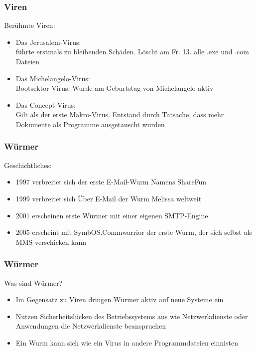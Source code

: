 \documentclass{beamer}
\begin{document}
\begin{frame}
	\frametitle{Viren}
	\begin{block}{Berühmte Viren:}
		\begin{itemize}
			\item Das Jerusalem-Virus:\\
			führte erstmals zu bleibenden Schäden. Löscht am Fr. 13. alle .exe und .com Dateien
			\item Das Michelangelo-Virus:\\
			Bootsektor Virus. Wurde am Geburtstag von Michelangelo aktiv
			\item Das Concept-Virus:\\
			Gilt als der erste Makro-Virus. Entstand durch Tatsache, dass mehr Dokumente als Programme ausgetauscht wurden
		\end{itemize}
	\end{block}			
\end{frame}

\begin{frame}
	\frametitle{Würmer}
		\begin{block}{Geschichtliches:}
			\begin{itemize}
				\item 1997 verbreitet sich der erste E-Mail-Wurm Namens ShareFun
				\item 1999 verbreitet sich Über E-Mail der Wurm Melissa weltweit
				\item 2001 erscheinen erste Würmer mit einer eigenen SMTP-Engine
				\item 2005 erscheint mit SymbOS.Commwarrior der erste Wurm, der sich selbst als MMS verschicken kann
			\end{itemize}
		\end{block}
\end{frame}

\begin{frame}
	\frametitle{Würmer}
		\begin{block}{Was sind Würmer?}
			\begin{itemize}
				\item Im Gegensatz zu Viren dringen Würmer aktiv auf neue Systeme ein
				\item Nutzen Sicherheitslücken des Betriebssystems aus wie Netzwerkdienste oder Anwendungen die Netzwerkdienste beanspruchen
				\item Ein Wurm kann sich wie ein Virus in andere Programmdateien einnisten
			\end{itemize}
		\end{block}
\end{frame}
\end{document}
